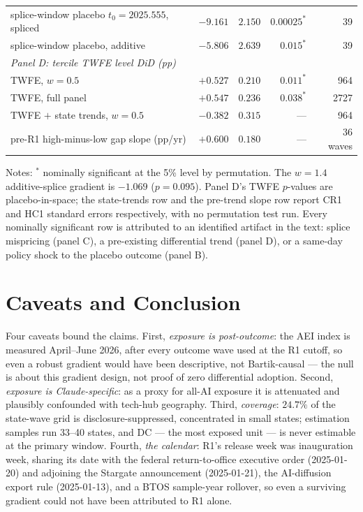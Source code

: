 \documentclass[11pt]{article}
\begin{document}
\begin{table}[t]
\begin{tabular}{lrrrr}
splice-window placebo $t_0=2025.555$, spliced & $-9.161$ & $2.150$ & $0.00025^{\ast}$ & 39 \\
splice-window placebo, additive    & $-5.806$ & $2.639$ & $0.015^{\ast}$ & 39 \\
\midrule
\multicolumn{5}{l}{\emph{Panel D: tercile TWFE level DiD (pp)}}\\
TWFE, $w=0.5$                      & $+0.527$ & $0.210$ & $0.011^{\ast}$ & 964 \\
TWFE, full panel                   & $+0.547$ & $0.236$ & $0.038^{\ast}$ & 2727 \\
TWFE $+$ state trends, $w=0.5$     & $-0.382$ & $0.315$ & --- & 964 \\
pre-R1 high-minus-low gap slope (pp/yr) & $+0.600$ & $0.180$ & --- & 36 waves \\
\bottomrule
\end{tabular}

\medskip
\parbox{0.92\textwidth}{\footnotesize Notes: $^{\ast}$ nominally significant
at the 5\% level by permutation. The $w=1.4$ additive-splice gradient is
$-1.069$ ($p=0.095$). Panel D's TWFE $p$-values are placebo-in-space; the
state-trends row and the pre-trend slope row report CR1 and HC1 standard
errors respectively, with no permutation test run. Every nominally
significant row is attributed to an identified artifact in the text: splice
mispricing (panel C), a pre-existing differential trend (panel D), or a
same-day policy shock to the placebo outcome (panel B).}
\end{table}

\section{Caveats and Conclusion}\label{sec:conclusion}

Four caveats bound the claims. First, \emph{exposure is post-outcome}: the
AEI index is measured April--June 2026, after every outcome wave used at the
R1 cutoff, so even a robust gradient would have been descriptive, not
Bartik-causal --- the null is about this gradient design, not proof of zero
differential adoption. Second, \emph{exposure is Claude-specific}: as a
proxy for all-AI exposure it is attenuated and plausibly confounded with
tech-hub geography. Third, \emph{coverage}: $24.7\%$ of the state-wave grid
is disclosure-suppressed, concentrated in small states; estimation samples
run 33--40 states, and DC --- the most exposed unit --- is never estimable
at the primary window. Fourth, \emph{the calendar}: R1's release week was
inauguration week, sharing its date with the federal return-to-office
executive order (2025-01-20) and adjoining the Stargate announcement
(2025-01-21), the AI-diffusion export rule (2025-01-13), and a BTOS
sample-year rollover, so even a surviving gradient could not have been
attributed to R1 alone.
\end{document}
